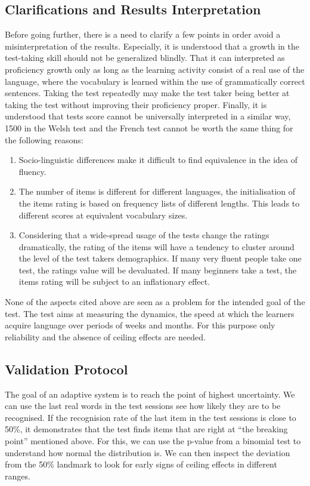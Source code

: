 \subsection{Clarifications and Results Interpretation}
Before going further, there is a need to clarify a few points in order avoid a misinterpretation of the results. Especially, it is understood that a growth in the test-taking skill should not be generalized blindly. That it can interpreted as proficiency growth only as long as the learning activity consist of a real use of the language, where the vocabulary is learned within the use of grammatically correct sentences. Taking the test repeatedly may make the test taker being better at taking the test without improving their proficiency proper. Finally, it is understood that tests score cannot be universally interpreted in a similar way, 1500 in the Welsh test and the French test cannot be worth the same thing for the following reasons:
\begin{enumerate}
  \item Socio-linguistic differences make it difficult to find equivalence in the idea of fluency.
  \item The number of items is different for different languages, the initialisation of the items rating is based on frequency lists of different lengths. This leads to different scores at equivalent vocabulary sizes.
  \item Considering that a wide-spread usage of the tests change the ratings dramatically, the rating of the items will have a tendency to cluster around the level of the test takers demographics. If many very fluent people take one test, the ratings value will be devaluated. If many beginners take a test, the items rating will be subject to an inflationary effect.
\end{enumerate}

None of the aspects cited above are seen as a problem for the intended goal of the test. The test aims at measuring the dynamics, the speed at which the learners acquire language over periods of weeks and months. For this purpose only reliability and the absence of ceiling effects are needed.

\subsection{Validation Protocol}
The goal of an adaptive system is to reach the point of highest uncertainty. We can use the last real words in the test sessions see how likely they are to be recognised. If the recognision rate of the last item in the test sessions is close to 50\%, it demonstrates that the test finds items that are right at ``the breaking point'' mentioned above. For this, we can use the p-value from a binomial test to understand how normal the distribution is. We can then inspect the deviation from the 50\% landmark to look for early signs of ceiling effects in different ranges.
